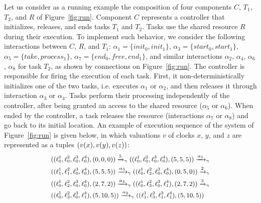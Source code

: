 
\begin{example}
  \label{exp:run}
  Let us consider as a running example the composition of four components $C$, $T_1$, $T_2$, and $R$ of Figure~\ref{fig:run}.
  Component $C$ represents a  controller that initializes, releases, and ends tasks $T_1$ and $T_2$.
  Tasks use the shared resource $R$ during their execution.
  To implement such behavior, we consider the following interactions between $C$, $R$, and $T_1$: $\alpha_1=\{init_0, init_1\}$,
    $\alpha_3=\{start_0, start_1\}$, $\alpha_5=\{ take, process_1\}$, $\alpha_7 = \{end_0, free, end_1 \}$, 
      and similar interactions $\alpha_2$, $\alpha_4$, $\alpha_6$, $\alpha_8$ for task $T_2$, 
      as shown by connections on Figure~\ref{fig:run}.
      The controller is responsible for firing
      the execution of each task. First, it non-deterministically initializes one
      of the two tasks, i.e. executes $\alpha_1$ or $\alpha_2$, and then
      releases it through interaction $\alpha_3$ or $\alpha_4$.
      Tasks perform their processing independently of the controller, after being granted an access to the shared resource ($\alpha_5$ or $\alpha_6$).
      When ended by the controller, a task releases the resource  (interactions $\alpha_7$ or $\alpha_8$) and go back to its initial location.
      An example of execution sequence of the system of Figure~\ref{fig:run} is given below, in which valuations $v$ of clocks $x$, $y$, and $z$ are represented as a tuples $(v(x),v(y),v(z))$:
      \begin{displaymath}
        \small{
        \begin{split}
          &((\ell_0^1,\ell_0^2,\ell_0^3,\ell_0^4),(0,0,0))\xrightarrow{5}_{\gamma}((\ell_0^1,\ell_0^2,\ell_0^3,\ell_0^4),(5,5,5))\xrightarrow{\alpha_1}_{\gamma}\\
          &((\ell_1^1,\ell_1^2,\ell_0^3,\ell_0^4),(5,5,5))\xrightarrow{\alpha_3}_{\gamma}((\ell_0^1,\ell_2^2,\ell_0^3,\ell_0^4),(0,5,0))\xrightarrow{2}_{\gamma}\\
          &((\ell_0^1,\ell_2^2,\ell_0^3,\ell_0^4),(2,7,2))\xrightarrow{\alpha_5}_{\gamma}((\ell_0^1,\ell_3^2,\ell_0^3,\ell_1^4),(2,7,2))\xrightarrow{3}_{\gamma}\\
          &((\ell_0^1,\ell_3^2,\ell_0^3,\ell_1^4),(5,10,5))\xrightarrow{\alpha_2}_{\gamma}((\ell_1^1,\ell_3^2,\ell_1^3,\ell_1^4),(5,10,5))\\
        \end{split}
      }
      \end{displaymath}
    
\end{example}
